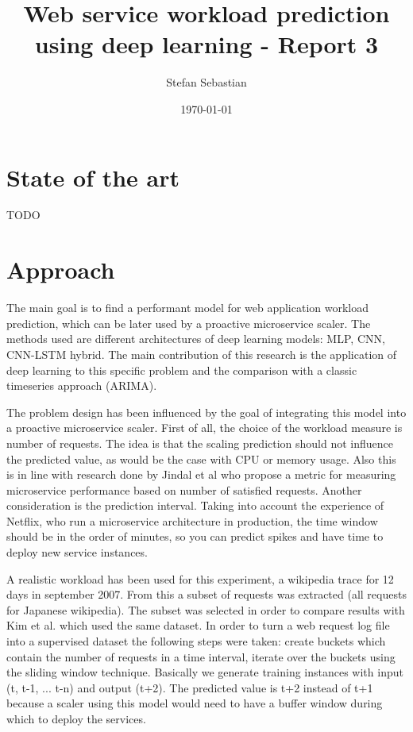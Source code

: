 \documentclass[12pt]{article}
\title{Web service workload prediction using deep learning - Report 3}
\date{\today}
\author{Stefan Sebastian}
\begin{document}
  \maketitle
  \newpage 

  \section{State of the art}
  TODO 

  \section{Approach}
  The main goal is to find a performant model for web application 
  workload prediction, which can be later used by a proactive 
  microservice scaler. The methods used are different architectures
  of deep learning models: MLP, CNN, CNN-LSTM hybrid. The main 
  contribution of this research is the application of deep learning 
  to this specific problem and the comparison with a classic timeseries
  approach (ARIMA).

  The problem design has been influenced by the goal of integrating
  this model into a proactive microservice scaler. First of all,
  the choice of the workload measure is number of requests. The idea
  is that the scaling prediction should not influence the predicted 
  value, as would be the case with CPU or memory usage. Also this is 
  in line with research done by Jindal et al\cite{msc} who propose 
  a metric for measuring microservice performance based on number of 
  satisfied requests. Another consideration is the prediction interval.
  Taking into account the experience of Netflix\cite{scryer}, who run 
  a microservice architecture in production, the time window should be in 
  the order of minutes, so you can predict spikes and have time to deploy
  new service instances.

  A realistic workload has been used for this experiment, a wikipedia 
  trace for 12 days in september 2007. From this a subset of requests was 
  extracted (all requests for Japanese wikipedia). The subset was selected 
  in order to compare results with Kim et al.\cite{CloudInsight} which used 
  the same dataset. In order to turn a web request log file into a supervised 
  dataset the following steps were taken: create buckets which contain the 
  number of requests in a time interval, iterate over the buckets using 
  the sliding window technique\cite{sliding_window}. Basically we generate 
  training instances with input (t, t-1, ... t-n) and output (t+2). The 
  predicted value is t+2 instead of t+1 because a scaler using this model 
  would need to have a buffer window during which to deploy the services.
\end{document}
